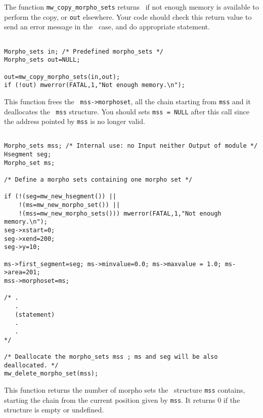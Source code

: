 The function \verb+mw_copy_morpho_sets+ returns \Null\ if not enough memory is available to perform
the copy, or \verb+out+ elsewhere.
Your code should check this return value to send an error message in the \Null\ case, and do appropriate statement.

\Next
\Example
\begin{verbatim}

Morpho_sets in; /* Predefined morpho_sets */
Morpho_sets out=NULL; 

out=mw_copy_morpho_sets(in,out);
if (!out) mwerror(FATAL,1,"Not enough memory.\n");
\end{verbatim}

\newpage %


\Description
This function frees the \mset\ \verb+mss->morphoset+, all the
chain starting from \verb+mss+ and it deallocates the \msets\ \verb+mss+ structure.
You should sets \verb+mss = NULL+ after this call since the address pointed
by \verb+mss+ is no longer valid.

\Next
\Example
\begin{verbatim}

Morpho_sets mss; /* Internal use: no Input neither Output of module */
Hsegment seg;
Morpho_set ms;

/* Define a morpho sets containing one morpho set */

if (!(seg=mw_new_hsegment()) ||
    !(ms=mw_new_morpho_set()) ||
    !(mss=mw_new_morpho_sets())) mwerror(FATAL,1,"Not enough memory.\n");
seg->xstart=0; 
seg->xend=200;
seg->y=10;

ms->first_segment=seg; ms->minvalue=0.0; ms->maxvalue = 1.0; ms->area=201;
mss->morphoset=ms;

/* .
   .
   (statement)
   .
   .
*/

/* Deallocate the morpho_sets mss ; ms and seg will be also deallocated. */
mw_delete_morpho_set(mss);

\end{verbatim}

\newpage %


\Description
This function returns the number of morpho sets the \msets\ structure \verb+mss+ contains,
starting the chain from the current position given by \verb+mss+.
It returns $0$ if the structure is empty or undefined.

